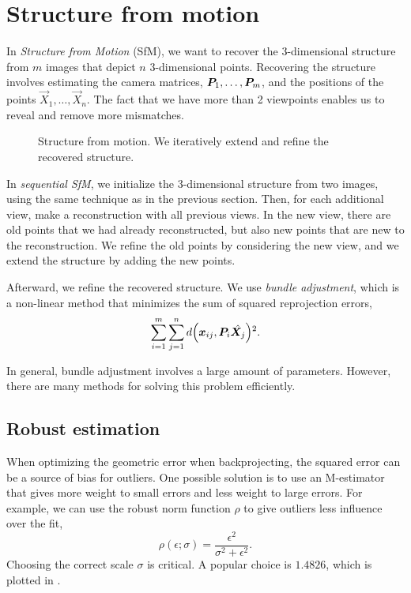 \section{Structure from motion} \label{sec:sfm}

In \textit{Structure from Motion} (SfM), we want to recover the 3-dimensional
structure from $m$ images that depict $n$ 3-dimensional points. Recovering the
structure involves estimating the camera matrices, $\bm{P}_1, \ldots,
    \bm{P}_m$, and the positions of the points $\vec{X}_1, \ldots, \vec{X}_n$. The
fact that we have more than 2 viewpoints enables us to reveal and remove more
mismatches.

\begin{figure}
    \centering
    \caption{Structure from motion. We iteratively extend and refine the
        recovered structure.}
    \label{fig:structure-from-motion}
\end{figure}

In \textit{sequential SfM}, we initialize the 3-dimensional structure from
two images, using the same technique as in the previous section. Then, for each
additional view, make a reconstruction with all previous views. In the new
view, there are old points that we had already reconstructed, but also new
points that are new to the reconstruction. We refine the old points by
considering the new view, and we extend the structure by adding the new points.

Afterward, we refine the recovered structure. We use \textit{bundle
    adjustment}, which is a non-linear method that minimizes the sum of squared
reprojection errors, \[
    \sum_{i=1}^m \sum_{j=1}^n d \lft( \vec{x}_{ij}, \mat{P}_i \hat{\mat{X}_j} \rgt)^2.
\]

In general, bundle adjustment involves a large amount of parameters. However,
there are many methods for solving this problem efficiently.

\subsection{Robust estimation}

When optimizing the geometric error when backprojecting, the squared error can
be a source of bias for outliers. One possible solution is to use an
M-estimator that gives more weight to small errors and less weight to large
errors. For example, we can use the robust norm function $\rho$ to give
outliers less influence over the fit, \[
    \rho(\epsilon; \sigma) = \frac{\epsilon^2}{\sigma^2 + \epsilon^2}.
\]
Choosing the correct scale $\sigma$ is critical. A popular choice is $1.4826$,
which is plotted in .

